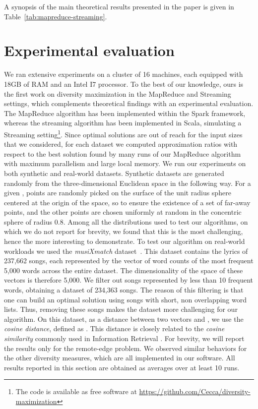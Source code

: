 \documentclass{article}
\begin{document}
A synopsis of the main theoretical results presented in the paper is
given in Table~\ref{tab:mapreduce-streaming}.

\section{Experimental evaluation}
\label{sec:experiments}
We ran extensive experiments on a cluster of 16 machines, each
equipped with 18GB of RAM and an Intel I7 processor.
To the best of our knowledge, ours is the first work on diversity
maximization in the MapReduce and Streaming settings, which
complements theoretical findings with an experimental evaluation.
The MapReduce algorithm has been implemented within the Spark
framework, whereas the streaming algorithm has been implemented in
Scala, simulating a Streaming setting\footnote{The code is available
  as free software at \url{https://github.com/Cecca/diversity-maximization}}.
Since optimal solutions are out of reach for the input sizes that we
considered, for each dataset we computed approximation ratios with
respect to the best solution found by many runs of our MapReduce
algorithm with maximum parallelism and large local memory.
We run our experiments on both synthetic and real-world datasets.
Synthetic datasets are generated randomly from the three-dimensional
Euclidean space in the following way.  For a given ,  points are
randomly picked on the surface of the unit radius sphere centered at
the origin of the space, so to ensure the existence of a set of
far-away points, and the other points are chosen uniformly at random
in the concentric sphere of radius 0.8. Among all the distributions
used to test our algorithms, on which we do not report for brevity, we found that this is the most challenging, hence the more
interesting to demonstrate.
To test our algorithm on real-world workloads we used the
\emph{musiXmatch} dataset~\cite{BertinM11}.  This dataset contains
the lyrics of 237,662 songs, each represented by the vector of word
counts of the most frequent 5,000 words across the entire dataset.  The
dimensionality of the space of these vectors is therefore 5,000.  We
filter out songs represented by less than 10 frequent words, obtaining
a dataset of 234,363 songs.  The reason of this filtering is that one
can build an optimal solution using songs with short, non overlapping
word lists. Thus, removing these songs makes the dataset more challenging
for our algorithm.  On this dataset, as a distance between two vectors
 and , we use the \emph{cosine distance}, defined as
. This distance is closely
related to the \emph{cosine similarity} commonly used in Information
Retrieval \cite{LeskovecRU14}.
For brevity, we will report the results only for the remote-edge
problem.  We observed similar behaviors for the other diversity
measures, which are all implemented in our software.  All results
reported in this section are obtained as averages over at least 10
runs.
\end{document}
